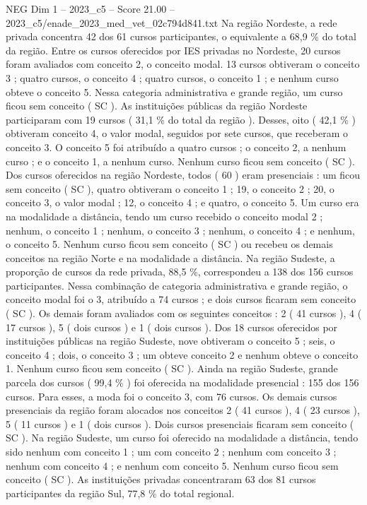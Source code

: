\begin{textsample}{NEG Dim 1 – 2023\_c5 – Score 21.00 – 2023\_c5/enade\_2023\_med\_vet\_02c794d841.txt}
Na região Nordeste, a rede privada concentra 42 dos 61 cursos participantes, o equivalente a 68,9 \% do total da região.
Entre os cursos oferecidos por IES privadas no Nordeste, 20 cursos foram avaliados com conceito 2, o conceito modal. 13 cursos obtiveram o conceito 3 ; quatro cursos, o conceito 4 ; quatro cursos, o conceito 1 ; e nenhum curso obteve o conceito 5.
Nessa categoria administrativa e grande região, um curso ficou sem conceito ( SC ).
As instituições públicas da região Nordeste participaram com 19 cursos ( 31,1 \% do total da região ).
Desses, oito ( 42,1 \% ) obtiveram conceito 4, o valor modal, seguidos por sete cursos, que receberam o conceito 3.
O conceito 5 foi atribuído a quatro cursos ; o conceito 2, a nenhum curso ; e o conceito 1, a nenhum curso.
Nenhum curso ficou sem conceito ( SC ).
Dos cursos oferecidos na região Nordeste, todos ( 60 ) eram presenciais : um ficou sem conceito ( SC ), quatro obtiveram o conceito 1 ; 19, o conceito 2 ; 20, o conceito 3, o valor modal ; 12, o conceito 4 ; e quatro, o conceito 5.
Um curso era na modalidade a distância, tendo um curso recebido o conceito modal 2 ; nenhum, o conceito 1 ; nenhum, o conceito 3 ; nenhum, o conceito 4 ; e nenhum, o conceito 5.
Nenhum curso ficou sem conceito ( SC ) ou recebeu os demais conceitos na região Norte e na modalidade a distância.
Na região Sudeste, a proporção de cursos da rede privada, 88,5 \%, correspondeu a 138 dos 156 cursos participantes.
Nessa combinação de categoria administrativa e grande região, o conceito modal foi o 3, atribuído a 74 cursos ; e dois cursos ficaram sem conceito ( SC ).
Os demais foram avaliados com os seguintes conceitos : 2 ( 41 cursos ), 4 ( 17 cursos ), 5 ( dois cursos ) e 1 ( dois cursos ).
Dos 18 cursos oferecidos por instituições públicas na região Sudeste, nove obtiveram o conceito 5 ; seis, o conceito 4 ; dois, o conceito 3 ; um obteve conceito 2 e nenhum obteve o conceito 1.
Nenhum curso ficou sem conceito ( SC ).
Ainda na região Sudeste, grande parcela dos cursos ( 99,4 \% ) foi oferecida na modalidade presencial : 155 dos 156 cursos.
Para esses, a moda foi o conceito 3, com 76 cursos.
Os demais cursos presenciais da região foram alocados nos conceitos 2 ( 41 cursos ), 4 ( 23 cursos ), 5 ( 11 cursos ) e 1 ( dois cursos ).
Dois cursos presenciais ficaram sem conceito ( SC ).
Na região Sudeste, um curso foi oferecido na modalidade a distância, tendo sido nenhum com conceito 1 ; um com conceito 2 ; nenhum com conceito 3 ; nenhum com conceito 4 ; e nenhum com conceito 5.
Nenhum curso ficou sem conceito ( SC ).
As instituições privadas concentraram 63 dos 81 cursos participantes da região Sul, 77,8 \% do total regional.

\end{textsample}
